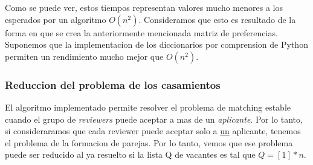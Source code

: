 \documentclass{article}
\begin{document}
                Como se puede ver, estos tiempos representan valores mucho menores a
                los esperados por un algoritmo $O(n^2)$. Consideramos que esto es
                resultado de la forma en que se crea la anteriormente mencionada
                matriz de preferencias. Suponemos que la implementacion de los
                diccionarios por comprension de Python permiten un rendimiento mucho
                mejor que $O(n^2)$.
            \subsubsection{Reduccion del problema de los casamientos}
                El algoritmo implementado permite resolver el problema de matching
                estable cuando el grupo de \emph{reviewers} puede aceptar a mas de
                un \emph{aplicante}. Por lo tanto, si consideraramos que cada reviewer
                puede aceptar solo a \underline{un} aplicante, tenemos el problema
                de la formacion de parejas. Por lo tanto, vemos que ese problema
                puede ser reducido al ya resuelto si la lista Q de vacantes es tal
                que $Q = [1]*n$.
\end{document}
